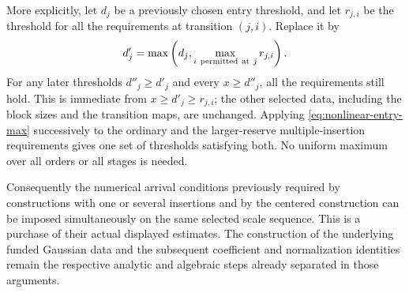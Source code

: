 More explicitly, let $d_j$ be a previously chosen entry threshold,
and let $r_{j,i}$ be the threshold for all the requirements at
transition $(j,i)$. Replace it by
\begin{equation}\label{eq:nonlinear-entry-max}
 d'_j=\max\left(d_j,\max_{i\ {\rm permitted\ at}\ j}r_{j,i}\right).
\end{equation}
For any later thresholds $d''_j\ge d'_j$ and every $x\ge d''_j$,
all the requirements still hold. This is immediate from
$x\ge d'_j\ge r_{j,i}$; the other selected data, including the
block sizes and the transition maps, are unchanged. Applying
\eqref{eq:nonlinear-entry-max} successively to the ordinary and
the larger-reserve multiple-insertion requirements gives one set
of thresholds satisfying both. No uniform maximum over all
orders or all stages is needed.

Consequently the numerical arrival conditions previously required
by constructions with one or several insertions and by the
centered construction can be imposed simultaneously on the same selected
scale sequence. This is a purchase of their actual displayed
estimates. The construction of the underlying funded Gaussian
data and the subsequent coefficient and normalization identities
remain the respective analytic and algebraic steps already
separated in those arguments.
